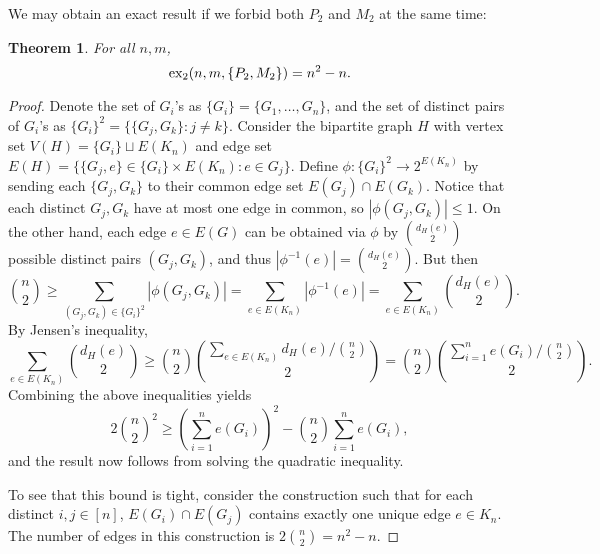 \documentclass[12pt]{report}
\newtheorem{theorem}{Theorem}[chapter]
\newcommand*{\dex}{\textnormal{ex}_2}
\begin{document}
We may obtain an exact result if we forbid both $P_2$ and $M_2$ at the same time:

\begin{theorem}
  For all $n, m$,
  \[
    \dex(n, m, \{P_2, M_2\}) = n^2 - n.
  \]
\end{theorem}

\begin{proof}
  Denote the set of $G_i$'s as $\{G_i\} = \{G_1, \ldots, G_n\}$, and the set of distinct pairs of $G_i$'s as $\{G_i\}^2 = \{\{G_j, G_k\} : j \neq k\}$. Consider the bipartite graph $H$ with vertex set $V(H) = \{G_i\} \sqcup E(K_n)$ and edge set $E(H) = \{\{G_j, e\} \in \{G_i\} \times E(K_n) : e \in G_j\}$. Define $\phi: \{G_i\}^2 \to 2^{E(K_n)}$ by sending each $\{G_j, G_k\}$ to their common edge set $E(G_j) \cap E(G_k)$. Notice that each distinct $G_j, G_k$ have at most one edge in common, so $|\phi(G_j, G_k)| \leq 1$. On the other hand, each edge $e \in E(G)$ can be obtained via $\phi$ by $\binom{d_H(e)}{2}$ possible distinct pairs $(G_j, G_k)$, and thus $|\phi^{-1}(e)| = \binom{d_H(e)}{2}$. But then
  \[
    \binom{n}{2} \geq \sum_{(G_j, G_k) \in \{G_i\}^2} |\phi(G_j, G_k)| = \sum_{e \in E(K_n)} |\phi^{-1}(e)| = \sum_{e \in E(K_n)} \binom{d_H(e)}{2}.
  \]
  By Jensen's inequality,
  \[
    \sum_{e \in E(K_n)} \binom{d_H(e)}{2} \geq \binom{n}{2}\binom{\sum_{e \in E(K_n)} d_H(e)/\binom{n}{2}}{2} = \binom{n}{2}\binom{\sum_{i = 1}^n e(G_i)/\binom{n}{2}}{2}.
  \]
  Combining the above inequalities yields
  \[
    2\binom{n}{2}^2 \geq \left(\sum_{i = 1}^n e(G_i)\right)^2 - \binom{n}{2}\sum_{i = 1}^n e(G_i),
  \]
  and the result now follows from solving the quadratic inequality.

  To see that this bound is tight, consider the construction such that for each distinct $i, j \in [n]$, $E(G_i) \cap E(G_j)$ contains exactly one unique edge $e \in K_n$. The number of edges in this construction is $2\binom{n}{2} = n^2 - n$.
\end{proof}
\end{document}
